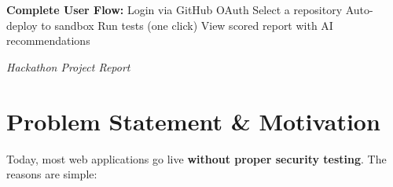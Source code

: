 \documentclass[11pt, a4paper]{article}
\begin{document}
\vspace{0.4cm}

\begin{center}
\end{center}

\vspace{0.3cm}

\begin{tcolorbox}[graycard]
\small
\textbf{Complete User Flow:}\enspace
\faSignInAlt\enspace Login via GitHub OAuth
\;\faArrowRight\;\faCodeBranch\enspace Select a repository
\;\faArrowRight\;\faRocket\enspace Auto-deploy to sandbox
\;\faArrowRight\;\faPlay\enspace Run tests (one click)
\;\faArrowRight\;\faFileAlt\enspace View scored report with AI recommendations
\end{tcolorbox}

\vspace{\fill}
\begin{center}
\small\color{muted}\textit{Hackathon Project Report}
\end{center}

\newpage


\section{Problem Statement \& Motivation}

Today, most web applications go live \textbf{without proper security testing}. The reasons are simple:
\end{document}
